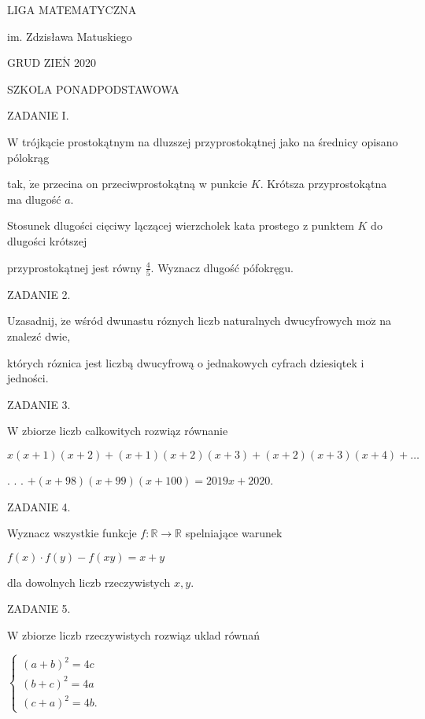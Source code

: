 \documentclass[a4paper,12pt]{article}
\begin{document}
LIGA MATEMATYCZNA

im. Zdzisława Matuskiego

GRUD Z$\mathrm{I}\mathrm{E}\acute{\mathrm{N}}$ 2020

SZKOLA PONADPODSTAWOWA

ZADANIE I.

$\mathrm{W}$ trójkącie prostokątnym na dluzszej przyprostokątnej jako na średnicy opisano pólokrąg

tak, $\dot{\mathrm{z}}\mathrm{e}$ przecina on przeciwprostokątną w punkcie $K$. Krótsza przyprostokątna ma dlugość $a.$

Stosunek dlugości cięciwy lączącej wierzcholek kata prostego z punktem $K$ do dlugości krótszej

przyprostokątnej jest równy $\displaystyle \frac{4}{5}$. Wyznacz dlugość pófokręgu.

ZADANIE 2.

Uzasadnij, $\dot{\mathrm{z}}\mathrm{e}$ wśród dwunastu róznych liczb naturalnych dwucyfrowych $\mathrm{m}\mathrm{o}\dot{\mathrm{z}}$ na znalez$\acute{}$ć dwie,

których róznica jest liczbą dwucyfrową o jednakowych cyfrach dziesiqtek i jedności.

ZADANIE 3.

$\mathrm{W}$ zbiorze liczb calkowitych rozwiąz równanie

$ x(x+1)(x+2)+(x+1)(x+2)(x+3)+(x+2)(x+3)(x+4)+\ldots$

. . . $+(x+98)(x+99)(x+100)=2019x+2020.$

ZADANIE 4.

Wyznacz wszystkie funkcje $f:\mathbb{R}\rightarrow \mathbb{R}$ spelniające warunek

$f(x)\cdot f(y)-f(xy)=x+y$

dla dowolnych liczb rzeczywistych $x, y.$

ZADANIE 5.

$\mathrm{W}$ zbiorze liczb rzeczywistych rozwiąz uklad równań

$\left\{\begin{array}{l}
(a+b)^{2}=4c\\
(b+c)^{2}=4a\\
(c+a)^{2}=4b.
\end{array}\right.$
\end{document}
